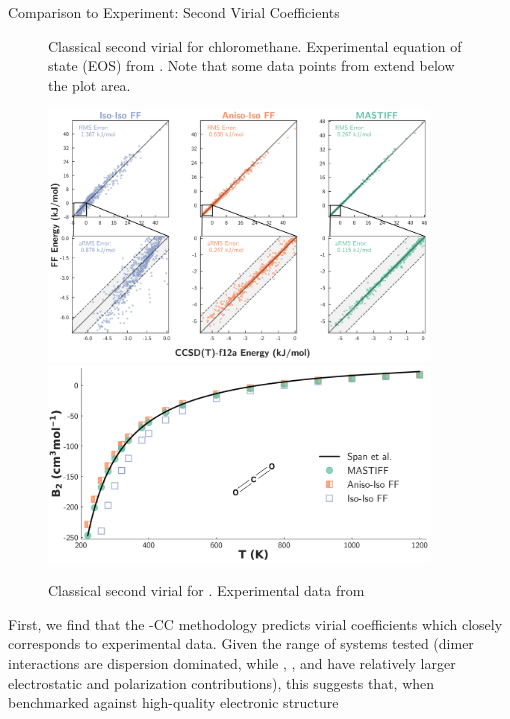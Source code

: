 \begin{subsection}{Comparison to Experiment: Second Virial Coefficients}
\begin{figure}[ht]
    \caption{
        Classical second virial for chloromethane. Experimental equation of
        state (EOS) from .
        Note that some data points from \isoff extend below the plot area.
            }
    \label{fig:chloromethane_virial}
    \end{figure}
    \begin{figure}[ht]
    \centering
    \includegraphics[width=0.9\textwidth]{anisotropic/scatterplots/co2_co2_comparison.pdf}
    \includegraphics[width=0.9\textwidth]{anisotropic/virials/co2/co2_2nd_virial.pdf}
    \caption{
        Classical second virial for \co. 
        Experimental data from 
            }
    \label{fig:co2_virial}
    \end{figure}
%
First,
we find that the \mastiff-CC
methodology predicts virial coefficients
which closely corresponds to experimental data. Given the range of systems
tested (\co dimer interactions are dispersion dominated, while \cl, \nh, and
\ho have relatively larger electrostatic and polarization contributions), 
this suggests that, when benchmarked against high-quality electronic structure

\end{subsection}
